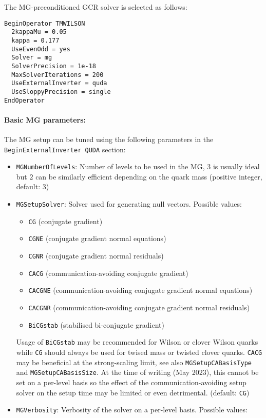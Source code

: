 The MG-preconditioned GCR solver is selected as follows:
\begin{verbatim}
BeginOperator TMWILSON
  2kappaMu = 0.05
  kappa = 0.177
  UseEvenOdd = yes
  Solver = mg
  SolverPrecision = 1e-18
  MaxSolverIterations = 200
  UseExternalInverter = quda
  UseSloppyPrecision = single
EndOperator
\end{verbatim}

\paragraph{Basic MG parameters:} The MG setup can be tuned using the following parameters in the \texttt{BeginExternalInverter QUDA} section:
\begin{itemize}
  \item{ \texttt{MGNumberOfLevels}: Number of levels to be used in the MG, $3$ is usually ideal but $2$ can be similarly efficient depending on the quark mass (positive integer, default: $3$) }
  \item{ \texttt{MGSetupSolver}: Solver used for generating null vectors. Possible values:
    \begin{itemize}
      \item \texttt{CG} (conjugate gradient)
      \item \texttt{CGNE} (conjugate gradient normal equations)
      \item \texttt{CGNR} (conjugate gradient normal residuals)
      \item \texttt{CACG} (communication-avoiding conjugate gradient)
      \item \texttt{CACGNE} (communication-avoiding conjugate gradient normal equations)
      \item \texttt{CACGNR} (communication-avoiding conjugate gradient normal residuals)
      \item \texttt{BiCGstab} (stabilised bi-conjugate gradient)
    \end{itemize}
    Usage of \texttt{BiCGstab} may be recommended for Wilson or clover Wilson quarks while \texttt{CG} should always be used for twised mass or twisted clover quarks. \texttt{CACG} may be beneficial at the strong-scaling limit, see also \texttt{MGSetupCABasisType} and \texttt{MGSetupCABasisSize}. At the time of writing (May 2023), this cannot be set on a per-level basis so the effect of the communication-avoiding setup solver on the setup time may be limited or even detrimental.
        (default: \texttt{CG})}
  \item{ \texttt{MGVerbosity}: Verbosity of the solver on a per-level basis. Possible values:
}
\end{itemize}
